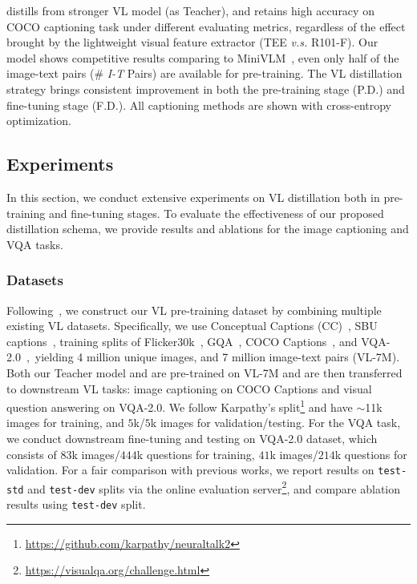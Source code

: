 \begin{table}[t!]
{    \distillvlm distills from stronger VL model (as Teacher), and retains high accuracy on COCO captioning task under different evaluating metrics, regardless of the effect brought by the lightweight visual feature extractor (TEE \textit{v.s.} R101-F). 
    Our model shows competitive results comparing to MiniVLM~\cite{wang2020minivlm}, even only half of the image-text pairs (\# \textit{I-T} Pairs) are available for pre-training. The VL distillation strategy brings consistent improvement in both the pre-training stage (P.D.) and fine-tuning stage (F.D.). All captioning methods are shown with cross-entropy optimization. 
}
\label{tab:main_tbl}
\end{table}


\subsection{Experiments}
In this section, we conduct extensive experiments on VL distillation both in pre-training and fine-tuning stages. To evaluate the effectiveness of our proposed distillation schema, we provide results and ablations for the image captioning and VQA tasks.



\subsubsection{Datasets}
Following~\cite{li2020oscar}, we construct our VL pre-training dataset by combining multiple existing VL datasets. Specifically, we use Conceptual Captions (CC)~\cite{sharma2018conceptual}, SBU captions~\cite{ordonez2011im2text}, training splits of Flicker30k~\cite{plummer2015flickr30k}, GQA~\cite{hudson2019gqa}, COCO Captions~\cite{lin2014microsoft}, and VQA-2.0~\cite{balanced_vqa_v2},~yielding 4 million unique images, and 7 million image-text pairs (VL-7M). Both our Teacher model and \distillvlm are pre-trained on VL-7M and are then transferred to downstream VL tasks: image captioning on COCO Captions and visual question answering on VQA-2.0. 
We follow Karpathy's split\footnote{\url{https://github.com/karpathy/neuraltalk2}} and have $\sim$11k images for training, and $5$k/$5$k images for validation/testing. For the VQA task, we conduct downstream fine-tuning and testing on VQA-2.0 dataset, which consists of $83$k images/$444$k questions for training, $41$k images/$214$k questions for validation. For a fair comparison with previous works, we report results on \texttt{test-std} and \texttt{test-dev} splits via the online evaluation server\footnote{\url{https://visualqa.org/challenge.html}}, and compare ablation results using \texttt{test-dev} split.


